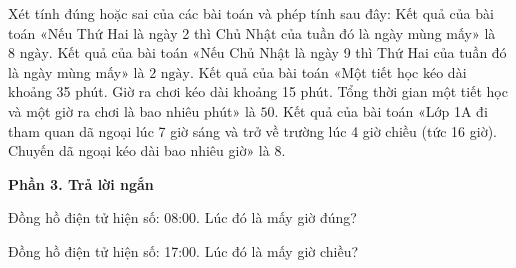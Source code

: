 \begin{ex} %
Xét tính đúng hoặc sai của các bài toán và phép tính sau đây:
\choiceTF
{\True Kết quả của bài toán «Nếu Thứ Hai là ngày 2 thì Chủ Nhật của tuần đó là ngày mùng mấy» là $8\text{ ngày}$.}
{Kết quả của bài toán «Nếu Chủ Nhật là ngày 9 thì Thứ Hai của tuần đó là ngày mùng mấy» là $2\text{ ngày}$.}
{\True Kết quả của bài toán «Một tiết học kéo dài khoảng 35 phút. Giờ ra chơi kéo dài khoảng 15 phút. Tổng thời gian một tiết học và một giờ ra chơi là bao nhiêu phút» là $50$.}
{Kết quả của bài toán «Lớp 1A đi tham quan dã ngoại lúc 7 giờ sáng và trở về trường lúc 4 giờ chiều (tức 16 giờ). Chuyến dã ngoại kéo dài bao nhiêu giờ» là $8$.}
\end{ex}

\textbf{Phần 3. Trả lời ngắn}

\begin{ex} %
Đồng hồ điện tử hiện số: 08:00. Lúc đó là mấy giờ đúng?
\end{ex}

\begin{ex} %
Đồng hồ điện tử hiện số: 17:00. Lúc đó là mấy giờ chiều?
\end{ex}

